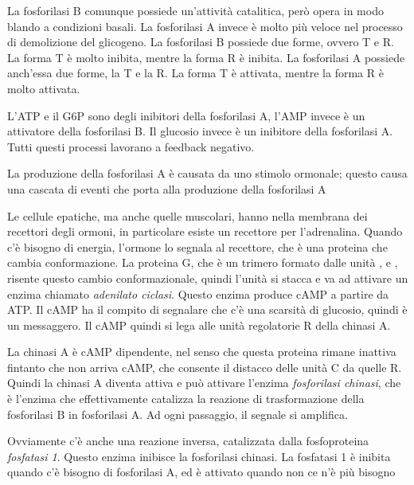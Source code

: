 
La fosforilasi B comunque possiede un'attività catalitica, però opera in modo blando a condizioni basali. La fosforilasi A invece è molto più veloce nel processo di demolizione del glicogeno. La fosforilasi B possiede due forme, ovvero T e R. La forma T è molto inibita, mentre la forma R è inibita. La fosforilasi A possiede anch'essa due forme, la T e la R. La forma T è attivata, mentre la forma R è molto attivata.

L'ATP e il G6P sono degli inibitori della fosforilasi A, l'AMP invece è un attivatore della fosforilasi B. Il glucosio invece è un inibitore della fosforilasi A. Tutti questi processi lavorano a feedback negativo.

La produzione della fosforilasi A è causata da uno stimolo ormonale; questo causa una cascata di eventi che porta alla produzione della fosforilasi A


Le cellule epatiche, ma anche quelle muscolari, hanno nella membrana dei recettori degli ormoni, in particolare esiste un recettore per l'adrenalina. Quando c'è bisogno di energia, l'ormone lo segnala al recettore, che è una proteina che cambia conformazione. La proteina G, che è un trimero formato dalle unità \alpha,\beta{} e \gamma, risente questo cambio conformazionale, quindi l'unità \alpha{} si stacca e va ad attivare un enzima chiamato \emph{adenilato ciclasi}. Questo enzima produce cAMP a partire da ATP. Il{} cAMP ha il compito di segnalare che c'è una scarsità di glucosio, quindi è un messaggero. Il cAMP quindi si lega alle unità regolatorie R della chinasi A.


La chinasi A è cAMP dipendente, nel senso che questa proteina rimane inattiva fintanto che non arriva cAMP, che consente il distacco delle unità C da quelle R. Quindi la chinasi A diventa attiva e può attivare l'enzima \emph{fosforilasi chinasi}, che è l'enzima che effettivamente catalizza la reazione di trasformazione della fosforilasi B in fosforilasi A.
Ad ogni passaggio, il segnale si amplifica.

Ovviamente c'è anche una reazione inversa, catalizzata dalla fosfoproteina \emph{fosfatasi 1}. Questo enzima inibisce la fosforilasi chinasi. La fosfatasi 1 è inibita quando c'è bisogno di fosforilasi A, ed è attivato quando non ce n'è più bisogno

